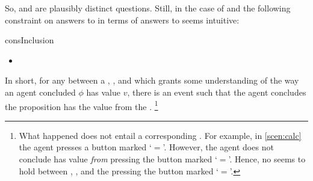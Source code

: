 \begin{note}
  So, \qWhy{} and \qHow{} are plausibly distinct questions.
  Still, in the case of \qWhy{} and \qHow{} the following constraint on answers to \qWhy{} in terms of answers to \qHow{} seems intuitive:

  \begin{constraint}{consInclusion}{\issueInclusion{}}
    \mbox{ }
    \vspace{-\baselineskip}
    \begin{itemize}
    \item
    \end{itemize}
    \vspace{-\baselineskip}
  \end{constraint}

  \noindent%
  In short, for any \ros{} between a , , and \pool{} which grants some understanding of the way an agent concluded \(\phi\) has value \(v\), there is an event such that the agent concludes the proposition has the value from the \pool{}.%
  \footnote{
    What happened does not entail a corresponding \ros{}.
    For example, in \autoref{scen:calc} the agent presses a button marked `\(=\)'.
    However, the agent does not conclude \propM{\gistCalcEq{}} has value  \emph{from} pressing the button marked `\(=\)'.
    Hence, no \ros{} seems to hold between \propM{\gistCalcEq{}}, , and the pressing the button marked `\(=\)'.
  }
\end{note}

